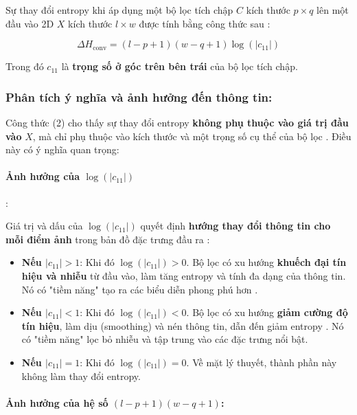 Sự thay đổi entropy khi áp dụng một bộ lọc tích chập \(C\) kích thước \(p \times q\) lên một đầu vào 2D \(X\) kích thước \(l \times w\) được tính bằng công thức sau \citep{meni2023}:

\begin{equation}
\Delta H_{\text{conv}} = (l - p + 1)(w - q + 1) \log(|c_{11}|)
\end{equation}

Trong đó \(c_{11}\) là \textbf{trọng số ở góc trên bên trái} của bộ lọc tích chập.

\subsubsection{Phân tích ý nghĩa và ảnh hưởng đến thông tin:}

Công thức (2) cho thấy sự thay đổi entropy \textbf{không phụ thuộc vào giá trị đầu vào} \(X\), mà chỉ phụ thuộc vào kích thước và một trọng số cụ thể của bộ lọc \citep{meni2023}. Điều này có ý nghĩa quan trọng:

\paragraph{Ảnh hưởng của \( \log(|c_{11}|) \)}:

Giá trị và dấu của \(\log(|c_{11}|)\) quyết định \textbf{hướng thay đổi thông tin cho mỗi điểm ảnh} trong bản đồ đặc trưng đầu ra \citep{meni2023}:

\begin{itemize}
    \item \textbf{Nếu \(|c_{11}| > 1\)}: Khi đó \(\log(|c_{11}|) > 0\). Bộ lọc có xu hướng \textbf{khuếch đại tín hiệu và nhiễu} từ đầu vào, làm tăng entropy và tính đa dạng của thông tin. Nó có "tiềm năng" tạo ra các biểu diễn phong phú hơn \citep{gabrie2018}.
    \item \textbf{Nếu \(|c_{11}| < 1\)}: Khi đó \(\log(|c_{11}|) < 0\). Bộ lọc có xu hướng \textbf{giảm cường độ tín hiệu}, làm dịu (smoothing) và nén thông tin, dẫn đến giảm entropy \citep{tishby1999}. Nó có "tiềm năng" lọc bỏ nhiễu và tập trung vào các đặc trưng nổi bật.
    \item \textbf{Nếu \(|c_{11}| = 1\)}: Khi đó \(\log(|c_{11}|) = 0\). Về mặt lý thuyết, thành phần này không làm thay đổi entropy.
\end{itemize}

\paragraph{Ảnh hưởng của hệ số \((l - p + 1)(w - q + 1)\):}

